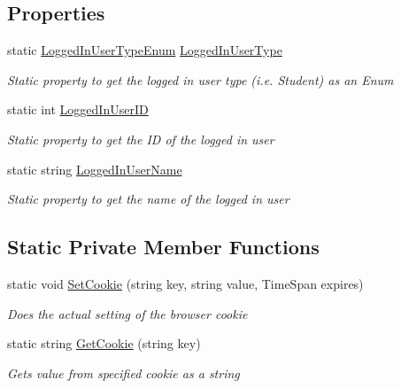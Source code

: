 \subsection*{Properties}
\begin{DoxyCompactItemize}
\item 
static \hyperlink{class_uni_enrollment___m_v_c_1_1_helpers_1_1_cookie_helper_a6ccf3689f1679dfef56e5e7e3a5f17c9}{Logged\+In\+User\+Type\+Enum} \hyperlink{class_uni_enrollment___m_v_c_1_1_helpers_1_1_cookie_helper_a3399b7e7ec670f2bff2bc6ae2939fca1}{Logged\+In\+User\+Type}
\begin{DoxyCompactList}\small\item\em Static property to get the logged in user type (i.\+e. \textquotesingle{}Student\textquotesingle{}) as an Enum \end{DoxyCompactList}\item 
static int \hyperlink{class_uni_enrollment___m_v_c_1_1_helpers_1_1_cookie_helper_ad8cb6ddc9015967aabd9c74f2000ea0c}{Logged\+In\+User\+ID}
\begin{DoxyCompactList}\small\item\em Static property to get the ID of the logged in user \end{DoxyCompactList}\item 
static string \hyperlink{class_uni_enrollment___m_v_c_1_1_helpers_1_1_cookie_helper_af0868f61f0e84f2a35120248405109d9}{Logged\+In\+User\+Name}
\begin{DoxyCompactList}\small\item\em Static property to get the name of the logged in user \end{DoxyCompactList}\end{DoxyCompactItemize}
\subsection*{Static Private Member Functions}
\begin{DoxyCompactItemize}
\item 
static void \hyperlink{class_uni_enrollment___m_v_c_1_1_helpers_1_1_cookie_helper_a27e1d840428523130254c4a2e75d4043}{Set\+Cookie} (string key, string value, Time\+Span expires)
\begin{DoxyCompactList}\small\item\em Does the actual setting of the browser cookie \end{DoxyCompactList}\item 
static string \hyperlink{class_uni_enrollment___m_v_c_1_1_helpers_1_1_cookie_helper_acaa314851f0c09c3f109349bdaa6d615}{Get\+Cookie} (string key)
\begin{DoxyCompactList}\small\item\em Gets value from specified cookie as a string \end{DoxyCompactList}\end{DoxyCompactItemize}
